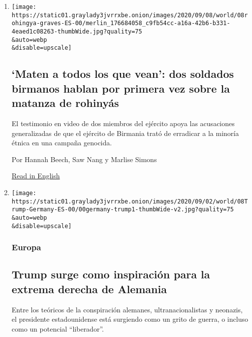 \begin{enumerate}
\def\labelenumi{\arabic{enumi}.}
\item
  \href{/es/2020/09/08/espanol/mundo/rohinya-genocidio-birmania.html}{}

  \texttt{[image: https://static01.graylady3jvrrxbe.onion/images/2020/09/08/world/08rohingya-graves-ES-00/merlin\_176684058\_c9fb54cc-a16a-42b6-b331-4eaed1c08263-thumbWide.jpg?quality=75\\\&auto=webp\\\&disable=upscale]}

  \hypertarget{maten-a-todos-los-que-vean-dos-soldados-birmanos-hablan-por-primera-vez-sobre-la-matanza-de-rohinyuxe1s}{%
  \subsection{`Maten a todos los que vean': dos soldados birmanos hablan
  por primera vez sobre la matanza de
  rohinyás}\label{maten-a-todos-los-que-vean-dos-soldados-birmanos-hablan-por-primera-vez-sobre-la-matanza-de-rohinyuxe1s}}

  El testimonio en video de dos miembros del ejército apoya las
  acusaciones generalizadas de que el ejército de Birmania trató de
  erradicar a la minoría étnica en una campaña genocida.

  Por Hannah Beech, Saw Nang y Marlise Simons

  \href{https://www.nytimes3xbfgragh.onion/2020/09/08/world/asia/myanmar-rohingya-genocide.html}{Read
  in English}
\item
  \href{/es/2020/09/08/espanol/mundo/trump-alemania-qanon.html}{}

  \texttt{[image: https://static01.graylady3jvrrxbe.onion/images/2020/09/02/world/08Trump-Germany-ES-00/00germany-trump1-thumbWide-v2.jpg?quality=75\\\&auto=webp\\\&disable=upscale]}

  \hypertarget{europa-4}{%
  \subsubsection{Europa}\label{europa-4}}

  \hypertarget{trump-surge-como-inspiraciuxf3n-para-la-extrema-derecha-de-alemania}{%
  \subsection{Trump surge como inspiración para la extrema derecha de
  Alemania}\label{trump-surge-como-inspiraciuxf3n-para-la-extrema-derecha-de-alemania}}

  Entre los teóricos de la conspiración alemanes, ultranacionalistas y
  neonazis, el presidente estadounidense está surgiendo como un grito de
  guerra, o incluso como un potencial ``liberador''.


\end{enumerate}
